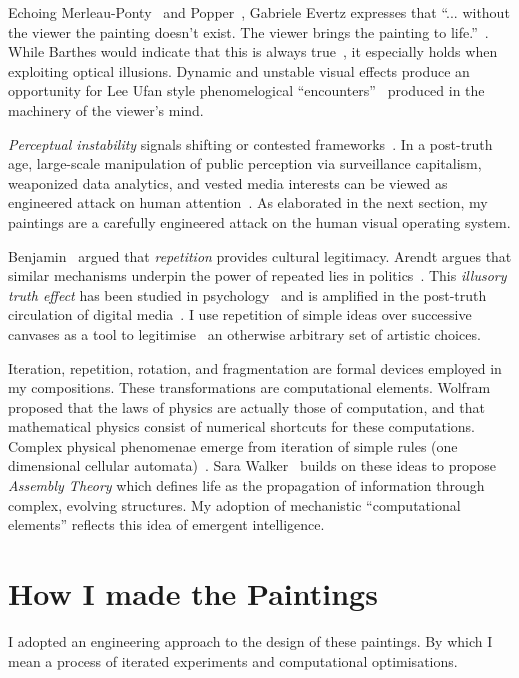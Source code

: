 \documentclass[12pt]{article}
\begin{document}
Echoing Merleau-Ponty~\cite{merleauPonty1962phenomenology} and
Popper~\cite{popper1972objective}, Gabriele Evertz expresses that
``... without the viewer the painting doesn't exist. The viewer brings
the painting to life.''~\cite{evertz09documentary}. While Barthes
would indicate that this is always true~\cite{barthes1977death}, it
especially holds when exploiting optical illusions. Dynamic and
unstable visual effects produce an opportunity for Lee Ufan style
phenomelogical ``encounters''~\cite[p. 52-6]{encounter} produced in
the machinery of the viewer's mind.

\emph{Perceptual instability} signals shifting or contested
frameworks~\cite{kuhn1970structure}. In a
post-truth~\cite{keyes2004posttruth,mcintyre2018posttruth} age,
large-scale manipulation of public perception via surveillance
capitalism, weaponized data analytics, and vested media interests can
be viewed as engineered attack on human
attention~\cite{zuboff2019surveillance, steyerl2016sea}. As elaborated
in the next section, my paintings are a carefully engineered attack on
the human visual operating system.

Benjamin~\cite{benjamin1935kunstwerk} argued that \emph{repetition}
provides cultural legitimacy. Arendt argues that similar mechanisms
underpin the power of repeated lies in
politics~\cite{arendt1972lying}. This \emph{illusory truth effect} has
been studied in psychology~\cite{hasher1977frequency} and is amplified
in the post-truth~\cite{keyes2004posttruth,mcintyre2018posttruth}
circulation of digital media~\cite{zuboff2019surveillance}. I use
repetition of simple ideas over successive canvases as a tool to
legitimise~\cite{foster1996return,neely-repetition} an otherwise
arbitrary set of artistic choices.

Iteration, repetition, rotation, and fragmentation are formal devices
employed in my compositions. These transformations are computational
elements. Wolfram~\cite{wolfram1984} proposed that the laws of physics
are actually those of computation, and that mathematical physics
consist of numerical shortcuts for these computations. Complex
physical phenomenae emerge from iteration of simple rules
(one dimensional cellular automata)~\cite{wolfram}. Sara
Walker~\cite{walker2024life} builds on these ideas to propose
\emph{Assembly Theory} which defines life as the propagation of
information through complex, evolving structures. My adoption of
mechanistic ``computational elements'' reflects this idea of
emergent intelligence.

\section{How I made the Paintings}\label{sec:process}
I adopted an engineering approach to the design of these paintings. By
which I mean a process of iterated experiments and computational
optimisations.
\end{document}
